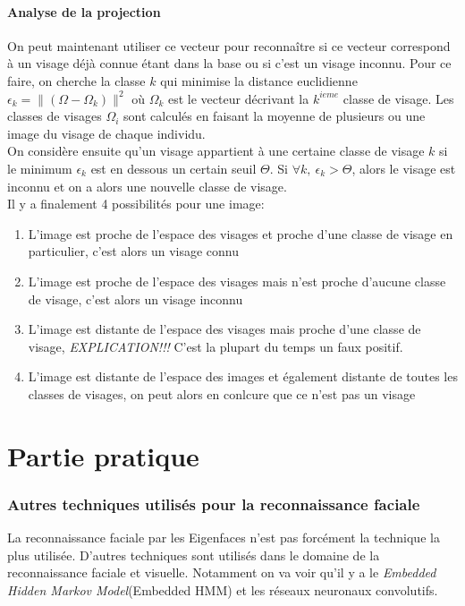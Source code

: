 \documentclass[12pt,french]{article}
\theoremstyle{plain}
\theoremstyle{definition}
\begin{document}
\subsection{Analyse de la projection}
On peut maintenant utiliser ce vecteur pour reconnaître si ce vecteur correspond à un visage déjà connue étant dans la base ou si c'est un visage inconnu.
Pour ce faire, on cherche la classe $k$ qui minimise la distance euclidienne $\epsilon_k = \|(\Omega - \Omega_k)\|^2$
où $\Omega_k$ est le vecteur décrivant la $k^{ieme}$ classe de visage. Les classes de visages $\Omega_i$ sont calculés en faisant la moyenne de plusieurs ou une image du visage de chaque individu. \\
On considère ensuite qu'un visage appartient à une certaine classe de visage $k$ si le minimum $\epsilon_k$ est en dessous un certain seuil $\Theta$.
Si $\forall k,~\epsilon_k > \Theta$, alors le visage est inconnu et on a alors une nouvelle classe de visage. \\
Il y a finalement 4 possibilités pour une image:
\begin{enumerate}
\item L'image est proche de l'espace des visages et proche d'une classe de visage en particulier, c'est alors un visage connu
\item L'image est proche de l'espace des visages mais n'est proche d'aucune classe de visage, c'est alors un visage inconnu
\item L'image est distante de l'espace des visages mais proche d'une classe de visage, \emph{EXPLICATION!!!} C'est la plupart du temps un faux positif.
\item L'image est distante de l'espace des images et également distante de toutes les classes de visages, on peut alors en conlcure que ce n'est pas un visage
\end{enumerate}




\newpage
\part{Partie pratique}
\section{Autres techniques utilisés pour la reconnaissance faciale}
La reconnaissance faciale par les Eigenfaces n'est pas forcément la technique la plus utilisée. D'autres techniques sont utilisés dans le domaine de la reconnaissance faciale et visuelle. Notamment on va voir qu'il y a le \textit{ Embedded Hidden Markov Model}(Embedded HMM) et les réseaux neuronaux convolutifs. 
\end{document}
